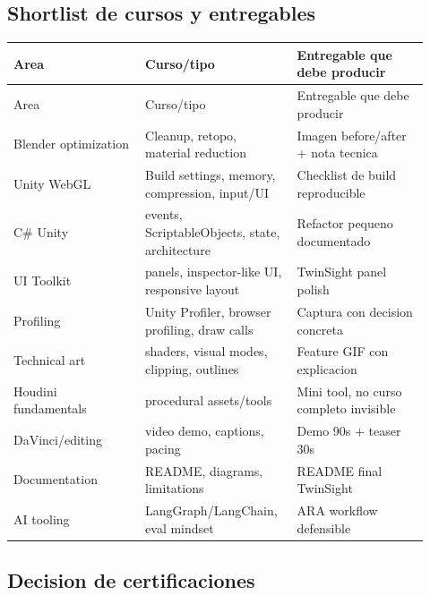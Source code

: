\subsection{Shortlist de cursos y entregables}


\begin{center}
\scriptsize
\begin{longtable}{>{\raggedright\arraybackslash}p{0.305\linewidth} >{\raggedright\arraybackslash}p{0.305\linewidth} >{\raggedright\arraybackslash}p{0.305\linewidth}}
\toprule
Area & Curso/tipo & Entregable que debe producir \\
\midrule
\endfirsthead
\toprule
Area & Curso/tipo & Entregable que debe producir \\
\midrule
\endhead
Blender optimization & Cleanup, retopo, material reduction & Imagen before/after + nota tecnica \\
Unity WebGL & Build settings, memory, compression, input/UI & Checklist de build reproducible \\
C\# Unity & events, ScriptableObjects, state, architecture & Refactor pequeno documentado \\
UI Toolkit & panels, inspector-like UI, responsive layout & TwinSight panel polish \\
Profiling & Unity Profiler, browser profiling, draw calls & Captura con decision concreta \\
Technical art & shaders, visual modes, clipping, outlines & Feature GIF con explicacion \\
Houdini fundamentals & procedural assets/tools & Mini tool, no curso completo invisible \\
DaVinci/editing & video demo, captions, pacing & Demo 90s + teaser 30s \\
Documentation & README, diagrams, limitations & README final TwinSight \\
AI tooling & LangGraph/LangChain, eval mindset & ARA workflow defensible \\
\bottomrule
\end{longtable}
\end{center}


\subsection{Decision de certificaciones}



